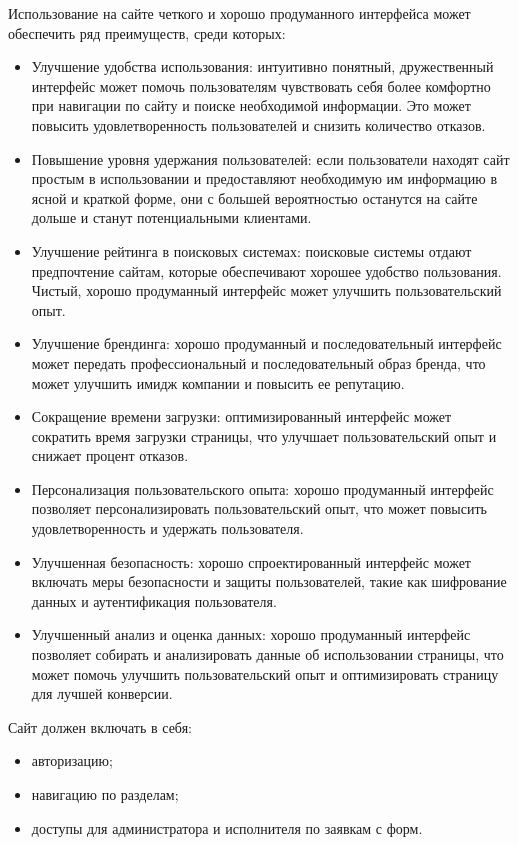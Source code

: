Использование на сайте четкого и хорошо продуманного интерфейса может обеспечить ряд преимуществ, среди которых:

\begin{itemize}
	\item Улучшение удобства использования: интуитивно понятный, дружественный интерфейс может помочь пользователям чувствовать себя более комфортно при навигации по сайту и поиске необходимой информации. Это может повысить удовлетворенность пользователей и снизить количество отказов.
	\item Повышение уровня удержания пользователей: если пользователи находят сайт простым в использовании и предоставляют необходимую им информацию в ясной и краткой форме, они с большей вероятностью останутся на сайте дольше и станут потенциальными клиентами.
	\item Улучшение рейтинга в поисковых системах: поисковые системы отдают предпочтение сайтам, которые обеспечивают хорошее удобство пользования. Чистый, хорошо продуманный интерфейс может улучшить пользовательский опыт.
	\item Улучшение брендинга: хорошо продуманный и последовательный интерфейс может передать профессиональный и последовательный образ бренда, что может улучшить имидж компании и повысить ее репутацию.
	\item Сокращение времени загрузки: оптимизированный интерфейс может сократить время загрузки страницы, что улучшает пользовательский опыт и снижает процент отказов.
	\item Персонализация пользовательского опыта: хорошо продуманный интерфейс позволяет персонализировать пользовательский опыт, что может повысить удовлетворенность и удержать пользователя.
	\item Улучшенная безопасность: хорошо спроектированный интерфейс может включать меры безопасности и защиты пользователей, такие как шифрование данных и аутентификация пользователя.
	\item Улучшенный анализ и оценка данных: хорошо продуманный интерфейс позволяет собирать и анализировать данные об использовании страницы, что может помочь улучшить пользовательский опыт и оптимизировать страницу для лучшей конверсии.
\end{itemize}

Сайт должен включать в себя:
\begin{itemize}
    \item авторизацию;
    \item навигацию по разделам;
    \item доступы для администратора и исполнителя по заявкам с форм.
\end{itemize}

